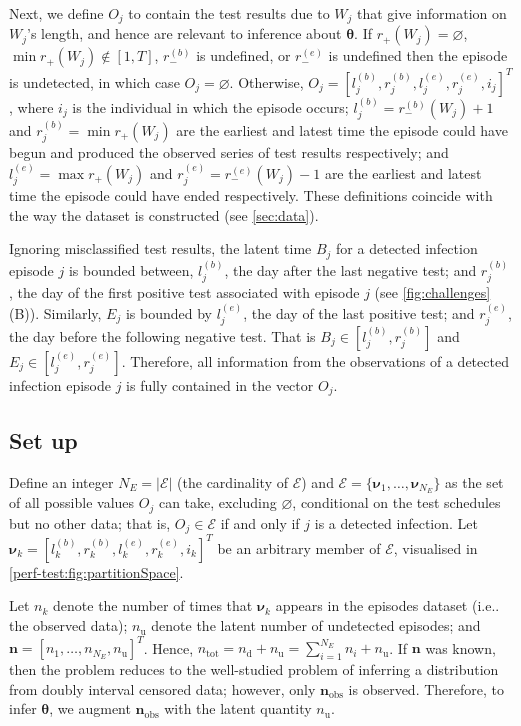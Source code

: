 \documentclass[12pt]{article}
\makeatletter
\newcommand\set{\mathcal}
\renewcommand{\vec}[1]{\bm{#1}}
\newcommand{\ntot}{n_\text{tot}}
\newcommand{\ndet}{n_\text{d}}
\newcommand{\nnodet}{n_\text{u}}
\newcommand{\na}{\vec{n}_\text{obs}}
\newcommand{\posResults}{r_{+}}
\newcommand{\negResults}{r_{-}}
\DeclareRobustCommand\onedot{\futurelet\@let@token\@onedot}
\def\@onedot{\ifx\@let@token.\else.\null\fi\xspace}
\def\ie{i.e\onedot} \def\Ie{{I.e}\onedot}
\makeatother
\begin{document}
Next, we define $O_j$ to contain the test results due to $W_j$ that give information on $W_j$'s length, and hence are relevant to inference about $\vec{\theta}$.
If $\posResults(W_j) = \varnothing$, $\min \posResults(W_j) \notin [1, T]$, $\negResults^{(b)}$ is undefined, or $\negResults^{(e)}$ is undefined then the episode is undetected, in which case $O_j = \varnothing$.
Otherwise, $O_j = [l_j^{(b)}, r_j^{(b)}, l_j^{(e)}, r_j^{(e)}, i_j]^T$, where $i_j$ is the individual in which the episode occurs; $l_j^{(b)} = \negResults^{(b)}(W_j) + 1$ and $r_j^{(b)} = \min \posResults(W_j)$ are the earliest and latest time the episode could have begun and produced the observed series of test results respectively; and $l_j^{(e)} = \max \posResults(W_j)$ and $r_j^{(e)} = \negResults^{(e)}(W_j) - 1$ are the earliest and latest time the episode could have ended respectively.
These definitions coincide with the way the dataset is constructed (see \cref{sec:data}).

Ignoring misclassified test results, the latent time $B_j$ for a detected infection episode $j$ is bounded between, $l_j^{(b)}$, the day after the last negative test; and $r_j^{(b)}$, the day of the first positive test associated with episode $j$ (see \cref{fig:challenges}(B)).
Similarly, $E_j$ is bounded by $l_j^{(e)}$, the day of the last positive test; and $r_j^{(e)}$, the day before the following negative test.
That is $B_j \in [l_j^{(b)}, r_j^{(b)}]$ and $E_j \in [l_j^{(e)}, r_j^{(e)}]$.
Therefore, all information from the observations of a detected infection episode $j$ is fully contained in the vector $O_j$.

\subsection{Set up} \label{sec:inference}

Define an integer $N_E = |\set{E}|$ (the cardinality of $\set{E}$) and $\set{E} = \{ \vec{\nu}_1, \dots, \vec{\nu}_{N_E} \}$ as the set of all possible values $O_j$ can take, excluding $\varnothing$, conditional on the test schedules but no other data; that is, $O_j \in \set{E}$ if and only if $j$ is a detected infection.
Let $\vec{\nu}_k = [l^{(b)}_k, r^{(b)}_k, l^{(e)}_k, r^{(e)}_k, i_k]^T$ be an arbitrary member of $\set{E}$, visualised in \cref{perf-test:fig:partitionSpace}.

Let $n_k$ denote the number of times that $\vec{\nu}_k$ appears in the episodes dataset (\ie the observed data); $\nnodet$ denote the latent number of undetected episodes; and $\vec{n} = [n_1, \dots, n_{N_E}, \nnodet]^T$.
Hence, $\ntot = \ndet + \nnodet = \sum_{i=1}^{N_E} n_i + \nnodet$.
If $\vec{n}$ was known, then the problem reduces to the well-studied problem of inferring a distribution from doubly interval censored data; however, only $\na$ is observed.
Therefore, to infer $\vec\theta$, we augment $\na$ with the latent quantity $\nnodet$.
\end{document}
